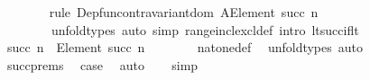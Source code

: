 \begin{isabellebody}
\ \ \ \ \ \ \isamarkupfalse%
\ {\isacharparenleft}{\kern0pt}rule\ Dep{\isacharunderscore}{\kern0pt}fun{\isacharunderscore}{\kern0pt}contravariant{\isacharunderscore}{\kern0pt}dom{\isacharbrackleft}{\kern0pt}\ {\isacharquery}{\kern0pt}A{\isacharequal}{\kern0pt}{\isachardoublequoteopen}Element\ {\isacharbrackleft}{\kern0pt}{}{\isacharcomma}{\kern0pt}{\isasymdots}{\isacharcomma}{\kern0pt}succ\ n{\isacharbrackright}{\kern0pt}{\isachardoublequoteclose}{\isacharbrackright}{\kern0pt}{\isacharparenright}{\kern0pt}\isanewline
\ \ \ \ \ \ \ \ {\isacharparenleft}{\kern0pt}unfold{\isacharunderscore}{\kern0pt}types{\isacharcomma}{\kern0pt}\ auto\ simp{\isacharcolon}{\kern0pt}\ range{\isacharunderscore}{\kern0pt}incl{\isacharunderscore}{\kern0pt}excl{\isacharunderscore}{\kern0pt}def\ intro{\isacharcolon}{\kern0pt}\ lt{\isacharunderscore}{\kern0pt}succ{\isacharunderscore}{\kern0pt}if{\isacharunderscore}{\kern0pt}lt{\isacharparenright}{\kern0pt}\isanewline
\ \ \ \ \isamarkupfalse%
\ {\isachardoublequoteopen}succ\ n\ {\isacharcolon}{\kern0pt}\ Element\ {\isacharbrackleft}{\kern0pt}{}{\isacharcomma}{\kern0pt}{\isasymdots}{\isacharcomma}{\kern0pt}succ\ n{\isacharbrackright}{\kern0pt}{\isachardoublequoteclose}\isanewline
\ \ \ \ \ \ \isamarkupfalse%
\ nat{\isacharunderscore}{\kern0pt}one{\isacharunderscore}{\kern0pt}def\ \isamarkupfalse%
\ unfold{\isacharunderscore}{\kern0pt}types\ auto\isanewline
\ \ \ \ \isamarkupfalse%
\ succ{\isachardot}{\kern0pt}prems\ \isamarkupfalse%
\ {\isacharquery}{\kern0pt}case\ \isamarkupfalse%
\ auto\isanewline
\ \ \isamarkupfalse%
\ simp\isanewline
{}\isamarkupfalse%
%
\endisatagproof
{\isafoldproof}%
%
\isadelimproof
\isanewline
%
\endisadelimproof
\isanewline
%
\isadelimtheory
\isanewline
%
\endisadelimtheory
%
\isatagtheory
{}\isamarkupfalse%
%
\endisatagtheory
{\isafoldtheory}%
%
\isadelimtheory
%
\endisadelimtheory
%
\end{isabellebody}%
\endinput
